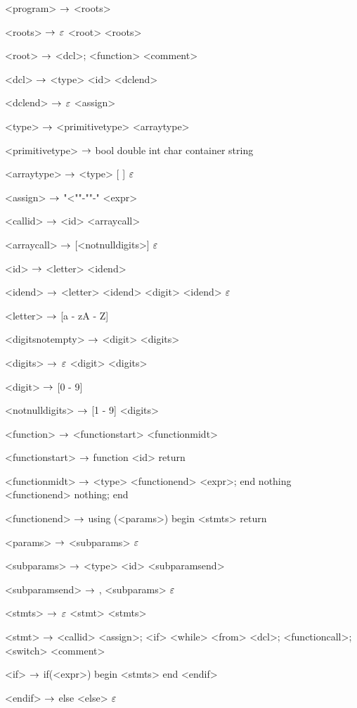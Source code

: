 \begin{grammar}
<program> $\rightarrow$ <roots>

<roots> $\rightarrow$ $\varepsilon$
\alt <root> <roots>

<root> $\rightarrow$ <dcl>;
\alt <function>
\alt <comment>

<dcl> $\rightarrow$ <type> <id> <dclend>

<dclend> $\rightarrow$ $\varepsilon$
\alt <assign> 

<type> $\rightarrow$ <primitivetype> <arraytype>

<primitivetype> $\rightarrow$ bool
\alt double
\alt int
\alt char
\alt container
\alt string

<arraytype> $\rightarrow$ <type> [ ]
\alt $\varepsilon$


<assign>  $\rightarrow$ "<""-""-" <expr>

<callid> $\rightarrow$ <id> <arraycall>

<arraycall> $\rightarrow$ [<notnulldigits>]
\alt $\varepsilon$

<id> $\rightarrow$ <letter> <idend>

<idend> $\rightarrow$ <letter> <idend>
	\alt <digit> <idend>
	\alt $\varepsilon$

<letter> $\rightarrow$ [a - zA - Z]

<digitsnotempty> $\rightarrow$ <digit> <digits>

<digits> $\rightarrow$ $\varepsilon$
\alt <digit> <digits>

<digit> $\rightarrow$ [0 - 9]

<notnulldigits> $\rightarrow$ [1 - 9] <digits>

<function> $\rightarrow$  <functionstart> <functionmidt>

<functionstart> $\rightarrow$ function <id> return

<functionmidt> $\rightarrow$ <type> <functionend> <expr>; end
\alt nothing <functionend> nothing; end

<functionend> $\rightarrow$
using (<params>)
begin
	<stmts>
	return

<params> $\rightarrow$ <subparams>
	\alt $\varepsilon$

<subparams> $\rightarrow$ <type> <id> <subparamsend>

<subparamsend> $\rightarrow$ , <subparams>
\alt $\varepsilon$

<stmts> $\rightarrow$ $\varepsilon$
	\alt <stmt> <stmts>

<stmt> $\rightarrow$ <callid> <assign>;
	\alt <if>
	\alt <while>
	\alt <from>
	\alt <dcl>;
	\alt <functioncall>;
	\alt <switch>
	\alt <comment>
	
<if> $\rightarrow$ if(<expr>)
	begin
		<stmts>
	end
	<endif>

<endif> $\rightarrow$ 
	else <else>
	\alt $\varepsilon$


\end{grammar}

